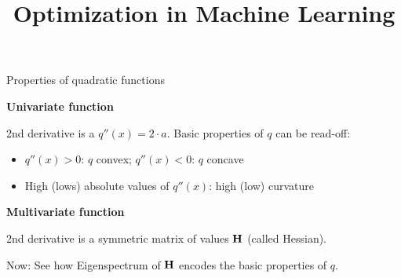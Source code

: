 \documentclass[11pt,compress,t,notes=noshow, xcolor=table]{beamer}
\title{Optimization in Machine Learning}
\date{}
\begin{document}
\sloppy


\begin{vbframe}{Properties of quadratic functions}

  \textbf{Univariate function} \vspace*{0.2cm}
  
  2nd derivative is a $q''(x) = 2 \cdot a$. Basic properties of $q$ can be read-off: 
  
  \begin{itemize}
    \item $q''(x) > 0$: $q$ convex; $q''(x) < 0$: $q$ concave
    \item High (lows) absolute values of $q''(x)$: high (low) curvature
  \end{itemize}
  
  \vspace*{0.2cm}
  
  \textbf{Multivariate function}\vspace*{0.2cm}
  
  2nd derivative is a symmetric matrix of values $\bf{H}$ (called Hessian). 
  
  \lz 
  
  Now: See how Eigenspectrum of $\bf{H}$ encodes the basic properties of $q$. 
  
  \end{vbframe}
  
\end{document}
